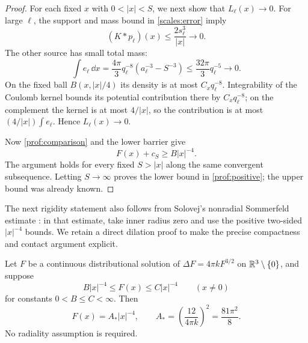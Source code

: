 \begin{proof}
For each fixed $x$ with $0<|x|<S$, we next show that
$L_\ell(x)\to0$.  For large $\ell$, the support and mass bound in
\eqref{scales:error} imply
\[
 (K*p_\ell)(x)\le \frac{2s_\ell^3}{|x|}\longrightarrow0.
\]
The other source has small total mass:
\[
 \int e_\ell\,\dd x
 =\frac{4\pi}{3}q_\ell^{-8}(a_\ell^{-3}-S^{-3})
 \le\frac{32\pi}{3}q_\ell^{-5}\longrightarrow0.
\]
On the fixed ball $B(x,|x|/4)$ its density is at most
$C_xq_\ell^{-8}$.  Integrability of the Coulomb kernel bounds its
potential contribution there by $C_xq_\ell^{-8}$; on the complement
the kernel is at most $4/|x|$, so the contribution is at most
$(4/|x|)\int e_\ell$.  Hence $L_\ell(x)\to0$.

Now \eqref{prof:comparison} and the lower barrier give
\[
 F(x)+c_S\ge B|x|^{-4}.
\]
The argument holds for every fixed $S>|x|$ along the same convergent
subsequence.  Letting $S\to\infty$ proves the lower bound in
\eqref{prof:positive}; the upper bound was already known.
\end{proof}

The next rigidity statement also follows from Solovej's nonradial
Sommerfeld estimate \cite[Lemma~4.4 and Remark~4.5]{Solovej2003}:
in that estimate, take inner radius zero and use the positive
two-sided $|x|^{-4}$ bounds.  We retain a direct dilation proof to
make the precise compactness and contact argument explicit.

\begin{lemma}
\label{prof:rigidity}
Let $F$ be a continuous distributional solution of
$\Delta F=4\pi kF^{3/2}$ on $\mathbb R^3\setminus\{0\}$, and suppose
\[
 B|x|^{-4}\le F(x)\le C|x|^{-4}\qquad(x\ne0)
\]
for constants $0<B\le C<\infty$.  Then
\begin{equation}
\label{prof:homogeneous}
 F(x)=A_*|x|^{-4},\qquad
 A_*=\left(\frac{12}{4\pi k}\right)^2=\frac{81\pi^2}{8}.
\end{equation}
No radiality assumption is required.
\end{lemma}

